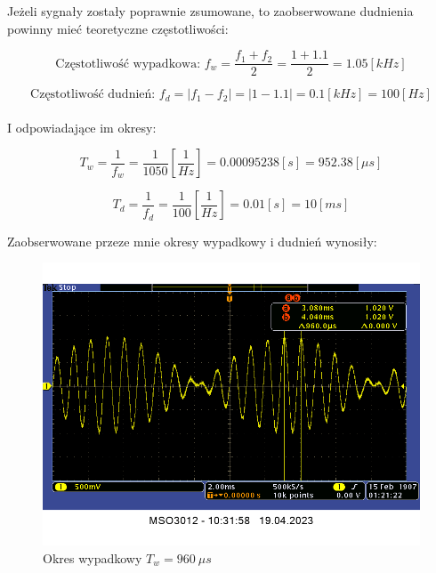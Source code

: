 \documentclass[14pt, table]{extarticle}
\begin{document}
Jeżeli sygnały zostały poprawnie zsumowane, to zaobserwowane dudnienia powinny mieć teoretyczne częstotliwości:

$$ \textrm{Częstotliwość wypadkowa: } f_w = \frac{f_1 + f_2}{2} = \frac{1 + 1.1}{2} = 1.05 \left[ kHz \right] $$ 

$$ \textrm{Częstotliwość dudnień: } f_d = \left| f_1 - f_2 \right| = \left| 1 -  1.1 \right| = 0.1 \left[ kHz \right] = 100 \left[ Hz \right] $$ \\

I odpowiadające im okresy:

$$ T_w = \frac{1}{f_w} = \frac{1}{1050} \left[ \frac{1}{Hz} \right] = 0.00095238 \left[ s \right] = 952.38 \left[ \mu s \right] $$

$$ T_d = \frac{1}{f_d} = \frac{1}{100} \left[ \frac{1}{Hz} \right] = 0.01 \left[ s \right] = 10 \left[ ms \right] $$

\newpage
Zaobserwowane przeze mnie okresy wypadkowy i dudnień wynosiły:

\begin{figure}[H]
\includegraphics[scale=0.6]{A20}
\centering
\captionsetup{labelformat=empty}
\caption{Okres wypadkowy $T_w = 960 \ \mu s$}
\end{figure}
\end{document}
